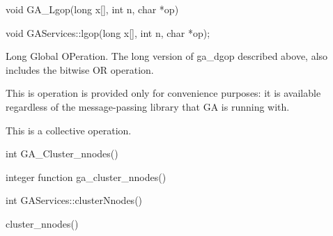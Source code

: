 \documentclass[12pt]{article}
\begin{document}

\begin{capi}
\begin{ccode}
void GA_Lgop(long x[], int n, char *op)
\end{ccode}
\begin{funcargs}
\end{funcargs}
\end{capi}

\begin{cxxapi}
\begin{cxxcode}
void GAServices::lgop(long x[], int n, char *op);
\end{cxxcode}
\begin{funcargs}
\end{funcargs}
\end{cxxapi}

\begin{desc}

Long Global OPeration. The long version of ga_dgop described above, 
also includes the bitwise OR operation.

This is operation is provided only for convenience purposes: it is 
available regardless of the message-passing library that GA is running with.

This is a collective operation.
\end{desc}


\begin{capi}
\begin{ccode}
int GA_Cluster_nnodes()
\end{ccode}
\end{capi}

\begin{fapi}
\begin{fcode}
integer function ga_cluster_nnodes()
\end{fcode}
\end{fapi}

\begin{cxxapi}
\begin{cxxcode}
int GAServices::clusterNnodes()
\end{cxxcode}
\end{cxxapi}

\begin{pyapi}
\begin{pycode}
cluster_nnodes() 
\end{pycode}
\end{pyapi}
\end{document}
